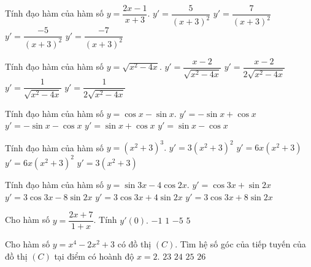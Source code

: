 \begin{ex}%
	Tính đạo hàm của hàm số $y=\dfrac{2x-1}{x+3}.$
	\choice
	{$y'=\dfrac{5}{(x+3)^2}$}
	{\True $y'=\dfrac{7}{(x+3)^2}$}
	{$y'=\dfrac{-5}{(x+3)^2}$}
	{$y'=\dfrac{-7}{(x+3)^2}$}
\end{ex}

\begin{ex}%
	Tính đạo hàm của hàm số $y=\sqrt{x^2-4x}.$
	\choice
	{\True $y'=\dfrac{x-2}{\sqrt{x^2-4x}}$}
	{$y'=\dfrac{x-2}{2\sqrt{x^2-4x}}$}
	{$y'=\dfrac{1}{\sqrt{x^2-4x}}$}
	{$y'=\dfrac{1}{2\sqrt{x^2-4x}}$}
\end{ex}

\begin{ex}%
	Tính đạo hàm của hàm số $y=\cos x -\sin x.$
	\choice
	{$y'=-\sin x +\cos x$}
	{\True $y'=-\sin x -\cos x$}
	{$y'=\sin x +\cos x$}
	{$y'=\sin x -\cos x$}
\end{ex}

\begin{ex}%
	Tính đạo hàm của hàm số  $y=\left (x^2+3\right )^3.$
	\choice
	{$y'=3(x^2+3)^2$}
	{$y'=6x(x^2+3)$}
	{\True $y'=6x(x^2+3)^2$}
	{$y'=3(x^2+3)$}
\end{ex}

\begin{ex}%
	Tính đạo hàm của hàm số $y=\sin 3x-4\cos 2x.$
	\choice
	{$y'=\cos 3x+\sin 2x$}
	{$y'=3\cos 3x-8\sin 2x$}
	{$y'=3\cos 3x+4\sin 2x$}
	{\True  $y'=3\cos 3x+8\sin 2x$}
\end{ex}

\begin{ex}%
	Cho hàm số $y=\dfrac{2x+7}{1+x}$. Tính $y'(0).$
	\choice
	{$-1$}
	{$1$}
	{\True $-5$}
	{$5$}
\end{ex}

\begin{ex}%
	Cho hàm số $y=x^4-2x^2+3$ có đồ thị $(C)$. Tìm hệ số góc của tiếp tuyến của đồ thị $(C)$ tại điểm có hoành độ $x=2.$
	\choice
	{$23$}
	{\True $24$}
	{$25$}
	{$26$}
\end{ex}

